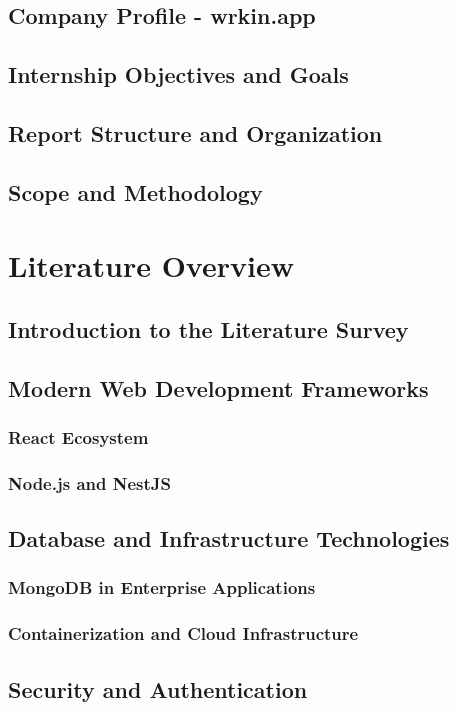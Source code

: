 \documentclass[a4paper, 11pt, oneside]{report}
\begin{document}
\section{Company Profile - wrkin.app}
\section{Internship Objectives and Goals}
\section{Report Structure and Organization}
\section{Scope and Methodology}


\chapter{Literature Overview}
\section{Introduction to the Literature Survey}
\section{Modern Web Development Frameworks}
\subsection{React Ecosystem}
\subsection{Node.js and NestJS}
\section{Database and Infrastructure Technologies}
\subsection{MongoDB in Enterprise Applications}
\subsection{Containerization and Cloud Infrastructure}
\section{Security and Authentication}
\end{document}
